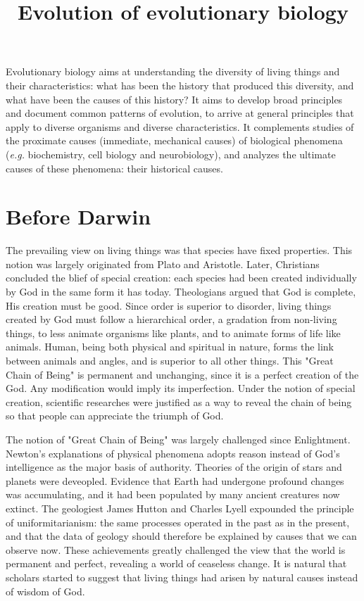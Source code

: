 \documentclass[11pt]{article}
\title{Evolution of evolutionary biology}
\author{}
\date{}
\begin{document}
\begin{sloppypar}
  \maketitle

  \linenumbers
Evolutionary biology aims at understanding the diversity of living things and their characteristics: what has been the history that produced this diversity, and what have been the causes of this history? 
It aims to develop broad principles and document common patterns of evolution, to arrive at general principles that apply to diverse organisms and diverse characteristics. 
It complements studies of the proximate causes (immediate, mechanical causes) of biological phenomena (\textit{e.g.} biochemistry, cell biology and neurobiology), and analyzes the ultimate causes of these phenomena: their historical causes. 

\section{Before Darwin}
The prevailing view on living things was that species have fixed properties. 
This notion was largely originated from Plato and Aristotle. 
Later, Christians concluded the blief of special creation: each species had been created individually by God in the same form it has today. 
Theologians argued that God is complete, His creation must be good. 
Since order is superior to disorder, living things created by God must follow a hierarchical order, a gradation from non-living things, to less animate organisms like plants, and to animate forms of life like animals. 
Human, being both physical and spiritual in nature, forms the link between animals and angles, and is superior to all other things. 
This "Great Chain of Being" is permanent and unchanging, since it is a perfect creation of the God. 
Any modification would imply its imperfection. 
Under the notion of special creation, scientific researches were justified as a way to reveal the chain of being so that people can appreciate the triumph of God. 

\par

The notion of "Great Chain of Being" was largely challenged since Enlightment. 
Newton's explanations of physical phenomena adopts reason instead of God's intelligence as the major basis of authority. 
Theories of the origin of stars and planets were deveopled. 
Evidence that Earth had undergone profound changes was accumulating, and it had been populated by many ancient creatures now extinct. 
The geologiest James Hutton and Charles Lyell expounded the principle of uniformitarianism: the same processes operated in the past as in the present, and that the data of geology should therefore be explained by causes that we can observe now. 
These achievements greatly challenged the view that the world is permanent and perfect, revealing a world of ceaseless change. 
It is natural that scholars started to suggest that living things had arisen by natural causes instead of wisdom of God. 


\end{sloppypar}
\end{document}

